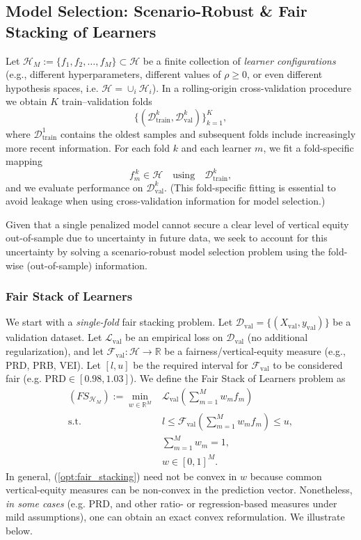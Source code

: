 \documentclass[11pt]{article}
\theoremstyle{plain}
\theoremstyle{definition}
\newcommand{\R}{\mathbb{R}}
\newcommand{\1}{\mathbf{1}}
\newcommand{\D}{\mathcal{D}}
\newcommand{\F}{\mathcal{F}}
\renewcommand{\L}{\mathcal{L}}
\renewcommand{\H}{\mathcal{H}}
\renewcommand{\R}{\mathbb{R}}
\begin{document}
{%
\subsection{Model Selection: Scenario-Robust \& Fair Stacking of Learners}

Let $\H_{M}:=\{f_{1}, f_2 ,\ldots, f_M\}\subset \H$ be a finite collection of \emph{learner configurations} (e.g., different hyperparameters, different values of $\rho\ge 0$, or even different hypothesis spaces, i.e. $\H=\cup_i \H_i$). In a rolling-origin cross-validation procedure we obtain $K$ train--validation folds
\[
\{(\D^k_{\mathrm{train}},\D^k_{\mathrm{val}})\}_{k=1}^K,
\]
where $\D^1_{\mathrm{train}}$ contains the oldest samples and subsequent folds include increasingly more recent information. For each fold $k$ and each learner $m$, we fit a fold-specific mapping
\[
f_m^{\,k} \in \H
\quad\text{using}\quad \D^k_{\mathrm{train}},
\]
and we evaluate performance on $\D^k_{\mathrm{val}}$. (This fold-specific fitting is essential to avoid leakage when using cross-validation information for model selection.)

Given that a single penalized model cannot secure a clear level of vertical equity out-of-sample due to uncertainty in future data, we seek to account for this uncertainty by solving a scenario-robust model selection problem using the fold-wise (out-of-sample) information.

\subsubsection{Fair Stack of Learners}

We start with a \emph{single-fold} fair stacking problem. Let $\D_{\mathrm{val}}=\{(X_{\mathrm{val}},y_{\mathrm{val}})\}$ be a validation dataset. Let $\L_{\mathrm{val}}$ be an empirical loss on $\D_{\mathrm{val}}$ (no additional regularization), and let $\F_{\mathrm{val}}:\H\to\R$ be a fairness/vertical-equity measure (e.g., PRD, PRB, VEI). Let $[l,u]$ be the required interval for $\F_{\mathrm{val}}$ to be considered fair (e.g. PRD$\in[0.98,1.03]$). We define the Fair Stack of Learners problem as
{\everymath{\displaystyle}
\begin{equation}
\label{opt:fair_stacking}
\begin{array}{rcl}
(FS_{\H_M}):= \min\limits_{w\in\R^M} & \L_{\mathrm{val}}\!\left(\sum_{m=1}^M w_m f_m \right)\\
\text{s.t.} & l \le \F_{\mathrm{val}}\!\left(\sum_{m=1}^M w_m f_m\right)\le u,\\
& \sum_{m=1}^M w_m =1,\\
& w\in[0,1]^M.
\end{array}
\end{equation}
}
In general, (\ref{opt:fair_stacking}) need not be convex in $w$ because common vertical-equity measures can be non-convex in the prediction vector. Nonetheless, \emph{in some cases} (e.g. PRD, and other ratio- or regression-based measures under mild assumptions), one can obtain an exact convex reformulation. We illustrate below.

}
\end{document}
